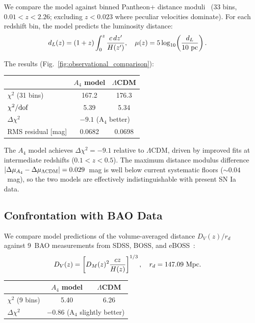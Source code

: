 We compare the model against binned Pantheon+ distance moduli~\cite{PantheonPlus2022}
(33 bins, $0.01 < z < 2.26$; excluding $z < 0.023$ where peculiar velocities
dominate). For each redshift bin, the model predicts the luminosity distance:
\begin{equation}
  d_L(z) = (1+z)\int_0^z \frac{c\,dz'}{H(z')},
  \quad \mu(z) = 5\log_{10}\!\left(\frac{d_L}{10~{\rm pc}}\right).
\end{equation}

The results (Fig.~\ref{fig:observational_comparison}):
\begin{center}
\begin{tabular}{lcc}
\toprule
 & $A_4$ model & $\Lambda$CDM \\
\midrule
$\chi^2$ (31 bins) & 167.2 & 176.3 \\
$\chi^2/{\rm dof}$ & 5.39 & 5.34 \\
$\Delta\chi^2$ & \multicolumn{2}{c}{$\mathbf{-9.1}$ (A$_4$ better)} \\
RMS residual [mag] & 0.0682 & 0.0698 \\
\bottomrule
\end{tabular}
\end{center}

The $A_4$ model achieves $\Delta\chi^2 = -9.1$ relative to $\Lambda$CDM,
driven by improved fits at intermediate redshifts ($0.1 < z < 0.5$).
The maximum distance modulus difference $|\Delta\mu_{A_4} - \Delta\mu_{\Lambda{\rm CDM}}|
= 0.029$~mag is well below current systematic floors ($\sim 0.04$~mag),
so the two models are effectively indistinguishable with present SN Ia data.

\subsection{Confrontation with BAO Data}
\label{ch3:bao}

We compare model predictions of the volume-averaged distance
$D_V(z)/r_d$ against 9~BAO measurements from SDSS, BOSS,
and eBOSS~\cite{SDSS_BAO2015}:
\begin{equation}
  D_V(z) = \left[D_M(z)^2 \frac{cz}{H(z)}\right]^{1/3},
  \quad r_d = 147.09~{\rm Mpc}.
\end{equation}

\begin{center}
\begin{tabular}{lcc}
\toprule
 & $A_4$ model & $\Lambda$CDM \\
\midrule
$\chi^2$ (9 bins) & 5.40 & 6.26 \\
$\Delta\chi^2$ & \multicolumn{2}{c}{$-0.86$ (A$_4$ slightly better)} \\
\bottomrule
\end{tabular}
\end{center}

